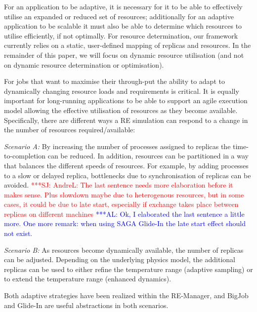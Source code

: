 \documentclass{rspublic}
\newcommand{\alnote}[1]{ {\textcolor{blue} { ***AL: #1 }}}
\newcommand{\jhanote}[1]{ {\textcolor{red} { ***SJ: #1 }}}
\newcommand{\alnote}[1]{}
\newcommand{\jhanote}[1]{}
\newcommand{\glidein}[1]{Glide-In }
\begin{document}
For an application to be adaptive, it is necessary for it to be able
to effectively utilise an expanded or reduced set of resources;
additionally for an adaptive application to be scalable it must also
be able to determine which resources to utilise efficiently, if not
optimally.  For resource determination, our framework currently relies
on a static, user-defined mapping of replicas and resources.  In the
remainder of this paper, we will focus on dynamic resource utilisation
(and not on dynamic resource determination or optimisation).




For jobs that want to maximise their through-put the ability to adapt
to dynamically changing resource loads and requirements is
critical. It is equally important for long-running applications to be
able to support an agile execution model allowing the effective
utilisation of resources as they become available.  Specifically,
there are different ways a RE simulation can respond to a change in
the number of resources required/available:
\begin{compactitem}         
\item {\it Scenario A:} By increasing the number of processes assigned
  to replicas the time-to-completion can be reduced. In addition,
  resources can be partitioned in a way that balances the different
  speeds of resources.  For example, by adding processes to a slow or
  delayed replica, bottlenecks due to synchronisation of replicas can
  be avoided.
  \jhanote{AndreL: The last sentence needs more elaboration before it
    makes sense. Plus slowdown maybe due to heterogenous resources,
    but in some cases, it could be due to late start, especially if
    exchange takes place between replicas on different machines}
  \alnote{Ok, I elaborated the last sentence a little more. One more
    remark: when using SAGA Glide-In the late start effect should not
    exist.}

\item {\it Scenario B:} As resources become dynamically available, the
  number of replicas can be adjusted. Depending on the underlying
  physics model, the additional replicas can be used to either refine
  the temperature range (adaptive sampling) or to extend the
  temperature range (enhanced dynamics).
\end{compactitem}           
Both adaptive strategies have been realized within the RE-Manager, and
BigJob and Glide-In are useful abstractions in both scenarios. 
\end{document}
